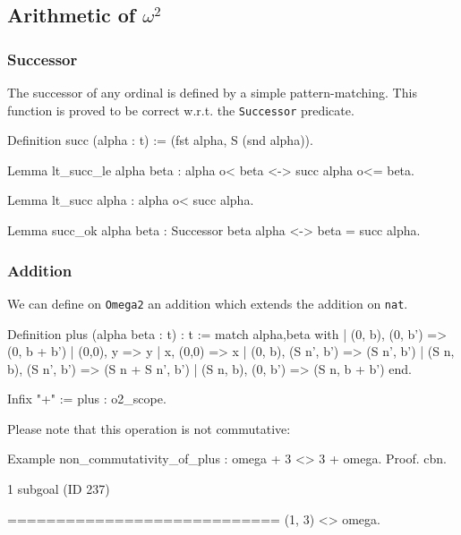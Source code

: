 \subsection{Arithmetic of \texorpdfstring{$\omega^2$}{omega^2}} 

\subsubsection{Successor}

The successor of any ordinal is defined by a simple pattern-matching.
This function is proved to be correct w.r.t. the \texttt{Successor} predicate.

\begin{Coqsrc}
Definition succ (alpha : t) := (fst alpha, S (snd alpha)).
\end{Coqsrc}

\begin{Coqsrc}
Lemma lt_succ_le alpha beta : alpha o< beta <-> succ alpha o<= beta.

Lemma lt_succ alpha : alpha o< succ alpha.

Lemma succ_ok alpha beta : Successor beta alpha <-> beta = succ alpha.
\end{Coqsrc}

\subsubsection{Addition}

We can define on \texttt{Omega2} an addition which extends the addition on \texttt{nat}.

\begin{Coqsrc}
Definition  plus (alpha beta : t) : t :=
  match alpha,beta with
  | (0, b), (0, b') => (0, b + b')
  | (0,0), y  => y
  | x, (0,0)  => x
  | (0, b), (S n', b') => (S n', b')
  | (S n, b), (S n', b') => (S n + S n', b')
  | (S n, b), (0, b') => (S n, b + b')
   end.

Infix "+" := plus : o2_scope.
\end{Coqsrc}

Please note that this operation is not commutative:

\begin{Coqsrc}
Example non_commutativity_of_plus :  omega + 3 <> 3 + omega.
Proof.
  cbn.
\end{Coqsrc}

\begin{Coqanswer}
1 subgoal (ID 237)
  
  ============================
(1, 3) <> omega.
\end{Coqanswer}

